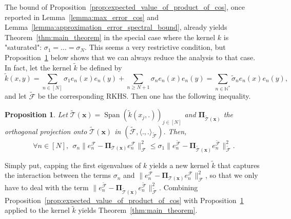 \documentclass[twoside,11pt]{book}
\newtheorem{proposition}{Proposition}
\numberwithin{theorem}{chapter}
\numberwithin{definition}{chapter}
\numberwithin{proposition}{chapter}
\numberwithin{corollary}{chapter}
\numberwithin{example}{chapter}
\numberwithin{lemma}{chapter}
\numberwithin{assumption}{chapter}
\DeclareMathOperator{\Span}{\mathrm{Span}}
\begin{document}
The bound of Proposition~\ref{prop:expected_value_of_product_of_cos}, once reported in  Lemma~\ref{lemma:max_error_cos} and Lemma~\ref{lemma:approximation_error_spectral_bound}, already yields Theorem~\ref{thm:main_theorem} in the special case where the kernel $k$ is "saturated": $\sigma_{1} = \dots = \sigma_{N}$. This seems a very restrictive condition, but Proposition~\ref{prop:kernel_perturbation_inequality} below shows that we can always reduce the analysis to that case.
In fact, let the kernel $\tilde{k}$ be defined by
\begin{equation}\label{eq:tilde_k_kernel_definition}
\tilde{k}(x,y) = \sum\limits_{n \in [N]} \sigma_{1}e_{n}(x)e_{n}(y) + \sum\limits_{n \geq N+1} \sigma_{n}e_{n}(x)e_{n}(y) = \sum\limits_{n \in \mathbb{N}^{*}} \tilde{\sigma}_{n}e_{n}(x)e_{n}(y),
\end{equation}
and let $\tilde{\mathcal{F}}$ be the corresponding RKHS. Then one has the following inequality.
\begin{proposition}\label{prop:kernel_perturbation_inequality}
Let $ \tilde{\mathcal{T}}(\bm{x}) = \Span \left( \tilde{k}(x_{j},.) \right)_{j \in [N]}$ and $\bm{\Pi}_{\tilde{\mathcal{T}}(\bm{x})}$ the orthogonal projection onto $\tilde{\mathcal{T}}(\bm{x})$ in $(\tilde{\mathcal{F}}, \langle .,.\rangle_{\tilde{\mathcal{F}}})$. Then,
\begin{equation}\label{eq:kernel_perturbation_inequality}
	\forall n \in [N], \:\: \sigma_{n} \|e_{n}^{\mathcal{F}} - \bm{\Pi}_{\mathcal{T}(\bm{x})} e_{n}^{\mathcal{F}}\|_{\mathcal{F}}^{2} \leq \sigma_{1}   \|e_{n}^{\tilde{\mathcal{F}}} - \bm{\Pi}_{\tilde{\mathcal{T}}(\bm{x})} e_{n}^{\tilde{\mathcal{F}}}\|_{\tilde{\mathcal{F}}}^{2}.
\end{equation}
\end{proposition}
Simply put, capping the first eigenvalues of $k$ yields a new kernel $\tilde{k}$ that captures the interaction between the terms $\sigma_{n}$ and $\|e_{n}^{\mathcal{F}} - \bm{\Pi}_{\mathcal{T}(\bm{x})} e_{n}^{\mathcal{F}}\|_{\mathcal{F}}^{2}$, so that we only have to deal with the term $\|e_{n}^{\tilde{\mathcal{F}}} - \bm{\Pi}_{\tilde{\mathcal{T}}(\bm{x})} e_{n}^{\tilde{\mathcal{F}}}\|_{\tilde{\mathcal{F}}}^{2}$.
Combining  Proposition~\ref{prop:expected_value_of_product_of_cos} with Proposition~\ref{prop:kernel_perturbation_inequality} applied to the kernel $\tilde{k}$ yields Theorem~\ref{thm:main_theorem}. 
\end{document}
